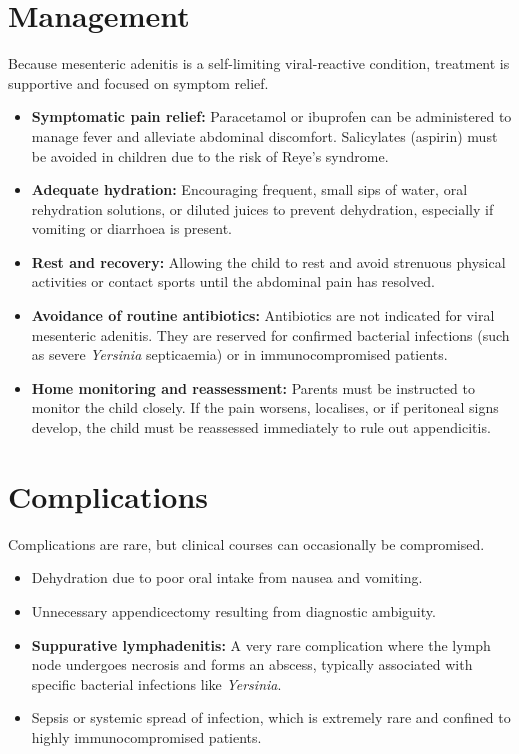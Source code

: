 \section*{Management}
Because mesenteric adenitis is a self-limiting viral-reactive condition, treatment is supportive and focused on symptom relief.
\begin{itemize}
    \item \textbf{Symptomatic pain relief:} Paracetamol or ibuprofen can be administered to manage fever and alleviate abdominal discomfort. Salicylates (aspirin) must be avoided in children due to the risk of Reye's syndrome.
    \item \textbf{Adequate hydration:} Encouraging frequent, small sips of water, oral rehydration solutions, or diluted juices to prevent dehydration, especially if vomiting or diarrhoea is present.
    \item \textbf{Rest and recovery:} Allowing the child to rest and avoid strenuous physical activities or contact sports until the abdominal pain has resolved.
    \item \textbf{Avoidance of routine antibiotics:} Antibiotics are not indicated for viral mesenteric adenitis. They are reserved for confirmed bacterial infections (such as severe \textit{Yersinia} septicaemia) or in immunocompromised patients.
    \item \textbf{Home monitoring and reassessment:} Parents must be instructed to monitor the child closely. If the pain worsens, localises, or if peritoneal signs develop, the child must be reassessed immediately to rule out appendicitis.
\end{itemize}

\section*{Complications}
Complications are rare, but clinical courses can occasionally be compromised.
\begin{itemize}
    \item Dehydration due to poor oral intake from nausea and vomiting.
    \item Unnecessary appendicectomy resulting from diagnostic ambiguity.
    \item \textbf{Suppurative lymphadenitis:} A very rare complication where the lymph node undergoes necrosis and forms an abscess, typically associated with specific bacterial infections like \textit{Yersinia}.
    \item Sepsis or systemic spread of infection, which is extremely rare and confined to highly immunocompromised patients.
\end{itemize}

